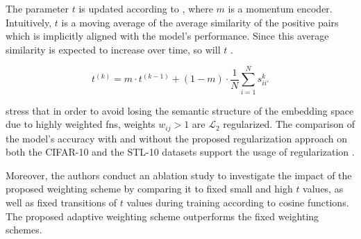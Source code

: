 The parameter $t$ is updated according to , where $m$ is a momentum encoder.
Intuitively, $t$ is a moving average of the average similarity of the positive pairs 
which is implicitly aligned with the model's performance. 
Since this average similarity is expected to increase over time, so will $t$ \citep{curricular_weighting_2024}.

\begin{equation}
    t^{(k)} = m \cdot t^{(k-1)} + (1-m) \cdot \frac{1}{N}\sum_{i=1}^{N}s^{k}_{ii'} 
    \label{eq:curricular_weighting_t_update}
\end{equation}

\citeauthor{curricular_weighting_2024} stress that in order to avoid losing the semantic structure of the embedding space 
due to highly weighted \acp{fn}, weights $w_{ij} > 1$ are $\mathcal{L}_2$ regularized.
The comparison of the model's accuracy with and without the proposed regularization approach on both the CIFAR-10 and the STL-10 datasets 
support the usage of regularization \citep{curricular_weighting_2024}.

Moreover, the authors conduct an ablation study to investigate the impact of the proposed weighting scheme 
by comparing it to fixed small and high $t$ values, as well as fixed transitions of $t$ values during training according to cosine functions.
The proposed adaptive weighting scheme outperforms the fixed weighting schemes.